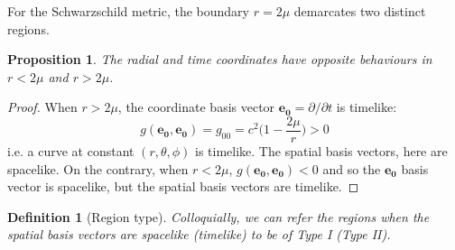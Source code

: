 \documentclass[a4paper]{article}
\theoremstyle{new}
\newtheorem{defi}{Definition}[section]
\newtheorem{prop}{Proposition}[section]
\begin{document}
For the Schwarzschild metric, the boundary $r=2\mu$ demarcates two distinct regions.
\begin{prop}
The radial and time coordinates have opposite behaviours in $r<2\mu$ and $r>2\mu$.
\end{prop}
\begin{proof}
When $r>2\mu$, the coordinate basis vector $\mathbf{e_0}=\partial/\partial t$ is timelike:
$$g(\mathbf{e_0},\mathbf{e_0})=g_{00}=c^2\bigg(1-\frac{2\mu}{r}\bigg)>0$$
i.e. a curve at constant $(r,\theta,\phi)$ is timelike. The spatial basis vectors, here are spacelike. On the contrary, when $r<2\mu$, $g(\mathbf{e_0},\mathbf{e_0})<0$ and so the $\mathbf{e_0}$ basis vector is spacelike, but the spatial basis vectors are timelike. 
\end{proof}
\begin{defi}[Region type]
Colloquially, we can refer the regions when the spatial basis vectors are spacelike (timelike) to be of Type I (Type II).
\end{defi}
\end{document}
